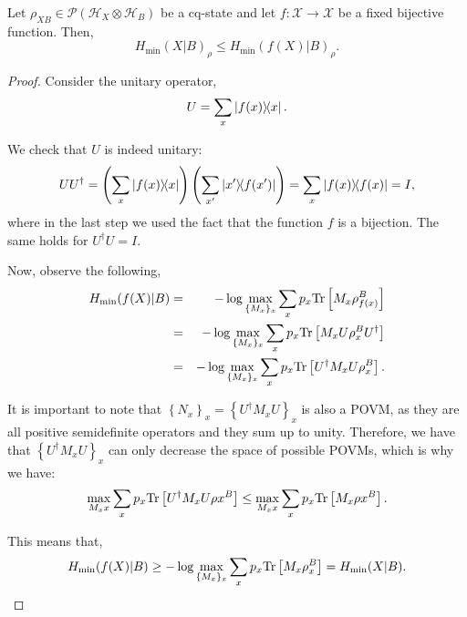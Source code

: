\begin{lemma}
Let $\rho_{XB} \in \mathcal{P}(\mathcal{H}_{X}\otimes \mathcal{H}_B)$ be a cq-state and let $f:\mathcal{X} \rightarrow \mathcal{X} $ be a fixed bijective function. Then,
$$H_{\min}(X|B)_{\rho} \leq H_{\min}(f(X)|B)_{\rho}.$$
\label{lemma:bijectivefunction}
\end{lemma}
\begin{proof}
Consider the unitary operator,
$$U = \sum_x \ketbra{f(x)}{x}.$$ 

We check that $U$ is indeed unitary:
\begin{equation*}
U U^{\dagger} = \left(\sum_x \ketbra{f(x)}{x}\right)\left(\sum_{x'} \ketbra{x'}{f(x')}\right) 
= \sum_x \ketbra{f(x)} = I,
\end{equation*}
where in the last step we used the fact that the function $f$ is a bijection. The same holds for $U^{\dagger}U = I$.

Now, observe the following,
\begin{eqnarray*}
H_{\min}(f(X)|B) &=& -\log \max_{\{M_x\}_x} \sum_x p_x \text{Tr}\left[M_x \rho_{f(x)}^B\right]\\
&=& -\log \max_{\{M_x\}_x} \sum_x p_x \text{Tr}\left[M_x U \rho_{x}^B U^{\dagger}\right]\\
&=& -\log \max_{\{M_x\}_x} \sum_x p_x \text{Tr}\left[U^{\dagger} M_x U \rho_{x}^B \right]. 
\end{eqnarray*}

It is important to note that $\left\{ N_x \right\}_x= \left\{U^{\dagger} M_x U\right\}_x$ is also a POVM, as they are all positive semidefinite operators and they sum up to unity. Therefore, we have that $\left\{U^{\dagger} M_x U\right\}_x$ can only decrease the space of possible POVMs, which is why we have:
$$\max_{{M_x}x} \sum_x p_x \text{Tr}\left[U^{\dagger} M_x U \rho{x}^B \right] \leq \max_{{M_x}x} \sum_x p_x \text{Tr}\left[ M_x \rho{x}^B \right].$$

This means that, 
\begin{equation*}
H_{\min}(f(X)|B) \geq -\log \max_{\{M_x\}_x} \sum_x p_x \text{Tr}\left[ M_x \rho_{x}^B \right] = H_{\min}(X|B).
\end{equation*}
\end{proof}

